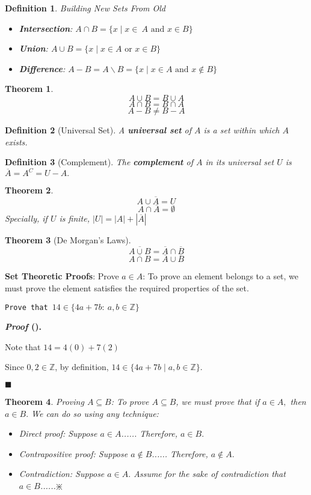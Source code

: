 \documentclass[12pt,a4paper]{article}
\newcounter{nprf}[subsection]
\newtheorem{thm}{Theorem}[subsection]
\newtheorem{df}{Definition}[subsection]
\newenvironment*{prf}{\par\indent\textbf{\textit{Proof} (\stepcounter{nprf}\thenprf). }\par}{\par\hfill $\blacksquare$\par}
\def\Z{{\mathbb{Z}}}
\begin{document}
\begin{df}
	Building New Sets From Old
	\begin{itemize}
		\item \textbf{Intersection}: $A\cap B=\{x\mid x\in\ A\text{ and }x\in B\}$
		\item \textbf{Union}: $A\cup B=\{x\mid x\in A\text{ or }x\in B\}$
		\item \textbf{Difference}: $A-B=A\backslash B=\{x\mid x\in A\text{ and }x\notin B\}$
	\end{itemize}
\end{df}
\begin{thm}
	\[A\cup B=B\cup A\]	
	\[A\cap B=B\cap A\]
	\[A-B\neq B-A\]
\end{thm}
\begin{df}[Universal Set]
	A \textbf{universal set} of $A$ is a set within which $A$ exists.	
\end{df}
\begin{df}[Complement]
	The \textbf{complement} of $A$ in its universal set $U$ is $\overline{A}=A^{C}=U-A.$	
\end{df}
\begin{thm}
	\[A\cup\overline{A}=U\]
	\[A\cap\overline{A}=\emptyset\]	
	Specially, if $U$ is finite, $|U|=|A|+|\overline{A}|$
\end{thm}
\begin{thm}[De Morgan's Laws]
	\[\overline{A\cup B}=\overline{A}\cap\overline{B}\]	
	\[\overline{A\cap B}=\overline{A}\cup\overline{B}\]
\end{thm}
\textbf{Set Theoretic Proofs}: Prove $a\in A$: To prove an element belongs to a set, we must prove the element satisfies the required properties of the set. 
\begin{framed}
\noindent\texttt{Prove that $14\in\{4a+7b:\ a,b\in\Z\}$}	
\begin{prf}
	Note that $14=4(0)+7(2)$\par Since $0,2\in\Z$, by definition, $14\in\{4a+7b\mid a,b\in\Z\}.$
\end{prf}
\end{framed}
\begin{thm}
	Proving $A\subseteq B$: To prove $A\subseteq B$, we must prove that if $a\in A,$ then $a\in B.$ We can do so using any technique:
	\begin{itemize}
		\item Direct proof: Suppose $a\in A$...... Therefore, $a\in B.$
		\item Contrapositive proof: Suppose $a\notin B$...... Therefore, $a\notin A.$
		\item Contradiction: Suppose $a\in A.$ Assume for the sake of contradiction that $a\in B$......$\divideontimes$
	\end{itemize}	
\end{thm}
\end{document}

